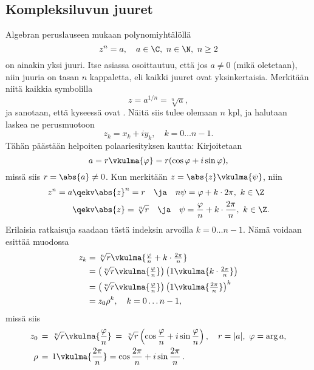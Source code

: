 \subsection*{Kompleksiluvun juuret}

Algebran peruslauseen mukaan polynomiyhtälöllä
\begin{equation} \label{kompleksiluvun juuret}
z^n = a, \quad a \in \C,\ n \in \N,\ n \ge 2
\end{equation}
on ainakin yksi juuri. Itse asiassa osoittautuu, että jos $a \neq 0$ (mikä oletetaan), niin 
juuria on tasan $n$ kappaletta, eli kaikki juuret ovat yksinkertaisia. Merkitään niitä kaikkia 
symbolilla
\[
z=a^{1/n}=\sqrt[n]{a},
\]
ja sanotaan, että kyseessä ovat . Näitä siis tulee olemaan 
$n$ kpl, ja halutaan laskea ne perusmuotoon
\[
z_k = x_k + iy_k, \quad k=0 \ldots n-1.
\]
Tähän päästään helpoiten polaariesityksen kautta: Kirjoitetaan
\[
a= r \vkulma{\varphi} = r (\cos \varphi + i \sin \varphi),
\]
missä siis $r= \abs{a} \neq 0$. Kun merkitään $z=\abs{z}\vkulma{\psi}$, niin
\begin{align*}
z^n = a &\qekv \abs{z}^n = r \quad\ja\quad n\psi=\varphi+k\cdot 2\pi,\ k\in\Z \\
        &\qekv \abs{z}=\sqrt[n]{r} \quad\ja\quad 
               \psi=\frac{\varphi}{n}+k\cdot\frac{2\pi}{n},\ k\in\Z.
\end{align*}
Erilaisia ratkaisuja saadaan tästä indeksin arvoilla $k=0 \ldots n-1$. Nämä voidaan esittää
muodossa
\begin{align*}
z_k &= \sqrt[n]{r}\vkulma{\tfrac{\varphi}{n}+k\cdot\tfrac{2\pi}{n}} \\
    &= \left(\sqrt[n]{r}\vkulma{\tfrac{\varphi}{n}}\right)
       \left(1\vkulma{k\cdot\tfrac{2\pi}{n}}\right) \\
    &= \left(\sqrt[n]{r}\vkulma{\tfrac{\varphi}{n}}\right)
       \left(1\vkulma{\tfrac{2\pi}{n}}\right)^k \\
    &= z_0\rho^k, \quad k=0 \ldots n-1,
\end{align*}
missä siis
\begin{align*}
z_0  &\,=\,\sqrt[n]{r}\vkulma{\frac{\varphi}{n}} 
      \,=\,\sqrt[n]{r}\left(\cos\frac{\varphi}{n}+i\sin\frac{\varphi}{n}\right), \quad
                             r=|a|,\ \varphi=\arg a, \\
\rho &\,=\, 1\vkulma{\frac{2\pi}{n}} = \cos\frac{2\pi}{n}+i\sin\frac{2\pi}{n}\,.
\end{align*}
